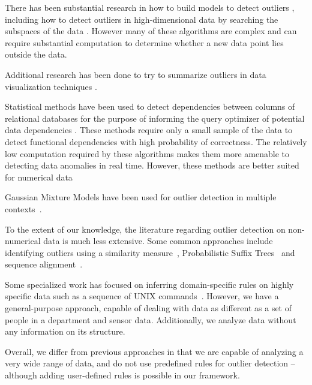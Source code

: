 
There has been substantial research in how to build models to detect outliers \cite{Aggarwal2013}, including how to detect outliers in high-dimensional data by searching the subspaces of the data \cite{Zhang2004}\cite{Kriegel2009}.
However many of these algorithms are complex and can require substantial computation to determine whether a new data point lies outside the data.

Additional research has been done to try to summarize outliers in data visualization techniques \cite{Wu}.

Statistical methods have been used to detect dependencies between columns of relational databases for the purpose of informing the query optimizer of potential data dependencies \cite{Ilyas2004}. These methods require only a small sample of the data to detect functional dependencies with high probability of correctness. The relatively low computation required by these algorithms makes them more amenable to detecting data anomalies in real time. However, these methods are better suited for numerical data~\cite{Hodge2004}

Gaussian Mixture Models have been used for outlier detection in multiple contexts~\cite{Lu2005,Roberts1994,Roberts1999}.

To the extent of our knowledge, the literature regarding outlier detection on non-numerical data is much less extensive. Some common approaches include identifying outliers using a similarity measure~\cite{Budalakoti2006}, Probabilistic Suffix Trees~\cite{Sun2006} and sequence alignment~\cite{Bouarfa2012}.

Some specialized work has focused on inferring domain-specific rules on highly specific data such as a sequence of UNIX commands~\cite{Lane1997a,Lane1997b}. However, we have a general-purpose approach, capable of dealing with data as different as a set of people in a department and sensor data. Additionally, we analyze data without any information on its structure.

Overall, we differ from previous approaches in that we are capable of analyzing a very wide range of data, and do not use predefined rules for outlier detection -- although adding user-defined rules is possible in our framework.